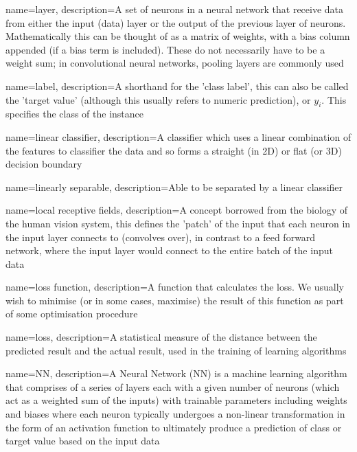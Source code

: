 
{
    name=layer,
    description={A set of neurons in a neural network that receive data from either the input (data) layer or the output of the previous layer of neurons. Mathematically this can be thought of as a matrix of weights, with a bias column appended (if a bias term is included). These do not necessarily have to be a weight sum; in convolutional neural networks, pooling layers are commonly used} 
}

{
    name=label,
    description={A shorthand for the 'class label', this can also be called the 'target value' (although this usually refers to numeric prediction), or $y_i$. This specifies the class of the instance}
}

{
    name=linear classifier,
    description={A classifier which uses a linear combination of the features to classifier the data and so forms a straight (in 2D) or flat (or 3D) decision boundary}
}

{
    name=linearly separable,
    description={Able to be separated by a linear classifier}
}

{
    name=local receptive fields,
    description={A concept borrowed from the biology of the human vision system, this defines the 'patch' of the input that each neuron in the input layer connects to (convolves over), in contrast to a feed forward network, where the input layer would connect to the entire batch of the input data}
}

{
    name=loss function,
    description={A function that calculates the loss. We usually wish to minimise (or in some cases, maximise) the result of this function as part of some optimisation procedure}
}

{
    name=loss,
    description={A statistical measure of the distance between the predicted result and the actual result, used in the training of learning algorithms}
}

{
    name={NN},
    description={A Neural Network (NN) is a machine learning algorithm that comprises of a series of layers each with a given number of neurons (which act as a weighted sum of the inputs) with trainable parameters including weights and biases where each neuron typically undergoes a non-linear transformation in the form of an activation function to ultimately produce a prediction of class or target value based on the input data}
}

